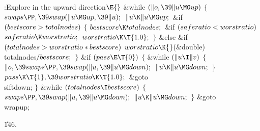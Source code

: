 \Y\B\4:Explore in the upward direction\X${}\E{}$\6
\&{while} ${}(\|o,\39\|u\MG\\{up}){}$\5
${}\{{}$\1\6
${}\\{swaps}\PP,\39\\{swap}(\|u\MG\\{up},\39\|u);{}$\6
${}\|u\K\|u\MG\\{up};{}$\6
\&{if} ${}(\\{bestscore}>\\{totalnodes}){}$\5
${}\{{}$\1\6
${}\\{bestscore}\K\\{totalnodes};{}$\6
\&{if} ${}(\\{saferatio}<\\{worstratio}){}$\1\5
${}\\{saferatio}\K\\{worstratio};{}$\2\6
${}\\{worstratio}\K\T{1.0};{}$\6
\4${}\}{}$\5
\2\&{else} \&{if} ${}(\\{totalnodes}>\\{worstratio}*\\{bestscore}){}$\1\5
${}\\{worstratio}\K{}$(\&{double}) \\{totalnodes}${}/\\{bestscore};{}$\2\6
\4${}\}{}$\2\6
\&{if} ${}(\\{pass}\E\T{0}){}$\5
${}\{{}$\1\6
\&{while} ${}(\|u\I\|v){}$\5
${}\{{}$\1\6
${}\|o,\39\\{swaps}\PP,\39\\{swap}(\|u,\39\|u\MG\\{down});{}$\6
${}\|u\K\|u\MG\\{down};{}$\6
\4${}\}{}$\2\6
${}\\{pass}\K\T{1},\39\\{worstratio}\K\T{1.0};{}$\6
\&{goto} \\{siftdown};\6
\4${}\}{}$\2\6
\&{while} ${}(\\{totalnodes}\I\\{bestscore}){}$\5
${}\{{}$\1\6
${}\\{swaps}\PP,\39\\{swap}(\|u,\39\|u\MG\\{down});{}$\6
${}\|u\K\|u\MG\\{down};{}$\6
\4${}\}{}$\2\6
\&{goto} \\{wrapup};\par
\U146.\fi

